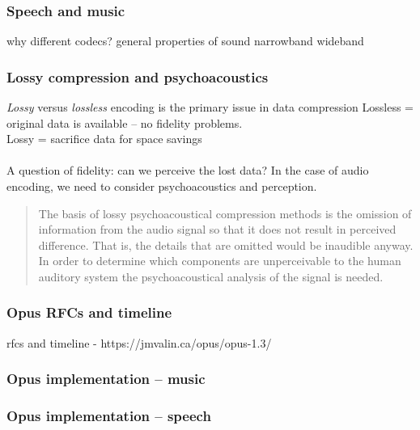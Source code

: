 \documentclass{beamer}
\begin{document}

\begin{frame}
	\frametitle{Speech and music}
	why different codecs? general properties of sound
	narrowband
	wideband
\end{frame}

\begin{frame}
	\frametitle{Lossy compression and psychoacoustics}
	\textit{Lossy} versus \textit{lossless} encoding is the primary issue in data compression
	Lossless = original data is available -- no fidelity problems.\\
	Lossy = sacrifice data for space savings\\\ \\
	A question of fidelity: can we perceive the lost data? In the case of audio encoding, we need to consider psychoacoustics and perception.
	\begin{quote}
		The basis of lossy psychoacoustical compression methods is the omission of information from the audio signal so that it does not result in perceived difference. That is, the details that are omitted would be inaudible anyway. In order to determine which components are unperceivable to the human auditory system the psychoacoustical analysis of the signal is needed.
	\end{quote}
\end{frame}

\begin{frame}
	\frametitle{Opus RFCs and timeline}
	rfcs and timeline - https://jmvalin.ca/opus/opus-1.3/
\end{frame}

\begin{frame}
	\frametitle{Opus implementation -- music}
\end{frame}

\begin{frame}
	\frametitle{Opus implementation -- speech}
\end{frame}
\end{document}
